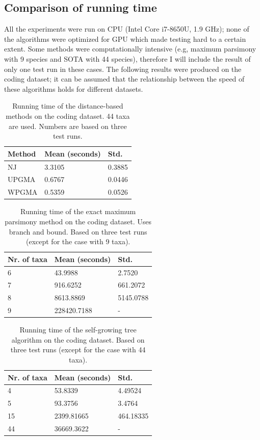 \documentclass[11pt,twocolumn]{article}
\begin{document}
\subsection{Comparison of running time}

All the experiments were run on CPU (Intel Core i7-8650U, 1.9 GHz); none of the algorithms were optimized for GPU which made testing hard to a certain extent. Some methods were computationally intensive (e.g, maximum parsimony with 9 species and SOTA with 44 species), therefore I will include the result of only one test run in these cases. The following results were produced on the coding dataset; it can be assumed that the relationship between the speed of these algorithms holds for different datasets.

\begin{table}[H]
\label{table:distance}
  \caption{Running time of the distance-based methods on the coding dataset. 44 taxa are used. Numbers are based on three test runs.}
  \centering
  \begin{tabular}{lll}
    \toprule
    Method & Mean (seconds) & Std. \\
    \midrule
    NJ & 3.3105 & 0.3885 \\
    UPGMA & 0.6767 & 0.0446 \\
    WPGMA & 0.5359 & 0.0526 \\	
    \bottomrule
  \end{tabular}
\end{table}

\begin{table}[H]
\label{table:mp}
  \caption{Running time of the exact maximum parsimony method on the coding dataset. Uses branch and bound. Based on three test runs (except for the case with 9 taxa).}
  \centering
  \begin{tabular}{lll}
    \toprule
    Nr. of taxa & Mean (seconds) & Std. \\
    \midrule
    6 & 43.9988 & 2.7520 \\
    7 & 916.6252 & 661.2072 \\
    8 & 8613.8869 & 5145.0788 \\
    9 & 228420.7188 & - \\
    \bottomrule
  \end{tabular}
\end{table}

\begin{table}[H]
\label{table:sota}
  \caption{Running time of the self-growing tree algorithm on the coding dataset. Based on three test runs (except for the case with 44 taxa).}
  \centering
  \begin{tabular}{lll}
    \toprule
    Nr. of taxa & Mean (seconds) & Std. \\
    \midrule
    4 & 53.8339 & 4.49524 \\
    5 & 93.3756 & 3.4764 \\
    15 & 2399.81665 & 464.18335 \\
    44 & 36669.3622 & - \\
    \bottomrule
  \end{tabular}
\end{table}
\end{document}
